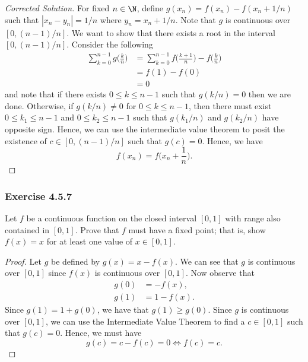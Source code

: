 \begin{enumerate}
        \begin{proof}[Corrected Solution]
            For fixed \( n \in \N  \), define \( g(x_n) = f(x_n) - f(x_n + 1/n) \) such that \( | x_n - y_n  | = 1/n  \) where \( y_n = x_n + 1 / n  \). Note that \( g  \) is continuous over \( [0, (n - 1) / n ] \). We want to show that there exists a root in the interval \( [0, (n-1) / n ] \). Consider the following
             \begin{align*}
                \sum_{ k=0  }^{ n-1 } g \Big( \frac{ k  }{ n }  \Big)  
                                      &= \sum_{ k=0  }^{ n-1 } f \Big( \frac{ k+1  }{ n  }  \Big) - f \Big( \frac{ k  }{ n }  \Big) \\
                                      &= f(1) - f(0) \\
                                      &= 0 
            \end{align*}
            and note that if there exists \(  0 \leq k \leq n - 1  \) such that \( g(k/n) = 0 \) then we are done. Otherwise, if \( g(k/n) \neq 0  \) for \( 0 \leq k \leq n -1  \), then there must exist \( 0 \leq k_1 \leq n-1  \) and \( 0 \leq k_2 \leq n - 1  \) such that \( g(k_1 / n ) \) and \( g(k_2 / n ) \) have opposite  sign. Hence, we can use the intermediate value theorem to posit the existence of \( c \in [0, (n-1)/n] \) such that \( g(c) = 0  \). Hence, we have 
            \[  f(x_n) = f\Big(x_n + \frac{ 1 }{ n }  \Big).\]

        \end{proof}
\end{enumerate}

\subsubsection{Exercise 4.5.7} Let \( f  \) be a continuous function on the closed interval \( [0,1] \) with range also contained in \( [0,1]  \). Prove that \( f  \) must have a fixed point; that is, show \( f(x) = x  \) for at least one value of \( x \in [0,1]  \). 
\begin{proof}
    Let \( g \) be defined by \( g(x) = x - f(x)\). We can see that \( g  \) is continuous over \( [0,1] \) since \( f(x)  \) is continuous over \( [0,1]  \). Now observe that 
    \begin{align*}
        g(0) &= -f(x), \tag{1}\\
        g(1) &= 1 - f(x). \tag{2}
    \end{align*}
    Since \( g(1) = 1  + g(0)  \), we have that \( g(1) \geq g(0)  \). Since \( g  \) is continuous over \( [0,1] \), we can use the Intermediate Value Theorem to find a \( c \in [0,1] \) such that \( g(c) = 0  \). Hence, we must have 
    \[  g(c) = c - f(c) = 0  \iff f(c) = c.  \]
\end{proof}

